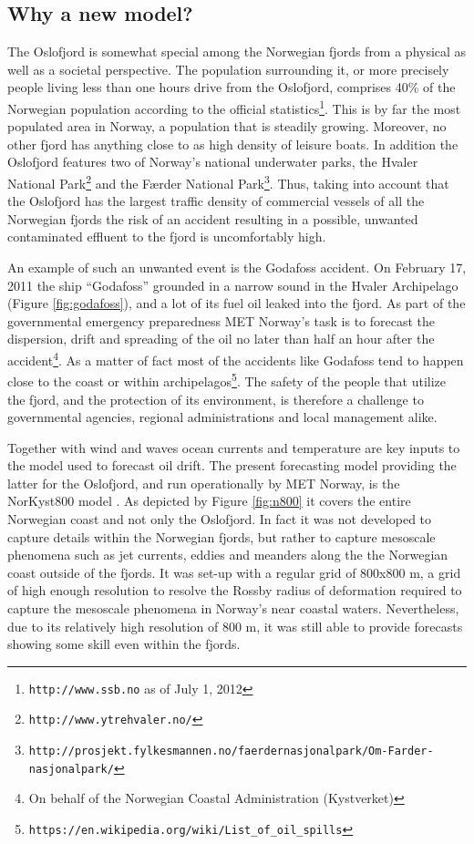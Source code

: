\subsection{Why a new model?}
\label{subsec:why}
The Oslofjord is somewhat special among the Norwegian fjords from a physical as well as a societal perspective. The population surrounding it, or more precisely people living less than one hours drive from the Oslofjord, comprises 40\% of the Norwegian population according to the official statistics\footnote{\texttt{http://www.ssb.no} as of July 1, 2012}. This is by far the most populated area in Norway, a population that is steadily growing. Moreover, no other fjord has anything close to as high density of leisure boats. In addition the Oslofjord features two of Norway's national underwater parks, the Hvaler National Park\footnote{\texttt{http://www.ytrehvaler.no/}} and the F{\ae}rder National Park\footnote{\texttt{http://prosjekt.fylkesmannen.no/faerdernasjonalpark/Om-Farder-nasjonalpark/}}. Thus, taking into account that the Oslofjord has the largest traffic density of commercial vessels of all the Norwegian fjords the risk of an accident resulting in a possible, unwanted contaminated effluent to the fjord is uncomfortably high. 
 

An example of such an unwanted event is the Godafoss accident. On February 17, 2011 the ship ``Godafoss'' grounded in a narrow sound in the Hvaler Archipelago (Figure \ref{fig:godafoss}), and a lot of its fuel oil leaked into the fjord. As part of the governmental emergency preparedness MET Norway's task is to forecast the dispersion, drift and spreading of the oil no later than half an hour after the accident\footnote{On behalf of the Norwegian Coastal Administration (Kystverket)}. As a matter of fact most of the accidents like Godafoss tend to happen close to the coast or within archipelagos\footnote{\texttt{https://en.wikipedia.org/wiki/List\_of\_oil\_spills}}. The safety of the people that utilize the fjord, and the protection of its environment, is therefore a challenge to governmental agencies, regional administrations and local management alike. 

Together with wind and waves ocean currents and temperature are key inputs to the model used to forecast oil drift. The present forecasting model providing the latter for the Oslofjord, and run operationally by MET Norway, is the NorKyst800 model \citep{albre:etal:2011}. As depicted by Figure \ref{fig:n800} it covers the entire Norwegian coast and not only the Oslofjord. In fact it was not developed to capture details within the Norwegian fjords, but rather to capture mesoscale phenomena such as jet currents, eddies and meanders along the the Norwegian coast outside of the fjords. It was set-up with a regular grid of 800x800 m, a grid of high  enough resolution to resolve the Rossby radius of deformation required to capture the mesoscale phenomena in Norway's near coastal waters. Nevertheless, due to its relatively high resolution of 800 m, it was still able to provide forecasts showing some skill even within the fjords.


